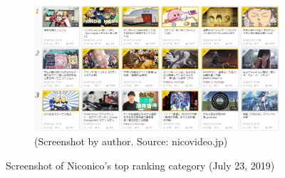 \documentclass[10pt,british,A4paper,,openany]{memoir}
\begin{document}
\begin{figure}[!htb]
 \centering
 \begin{subfigure}[b]{0.75\textwidth}
  \includegraphics[width=\textwidth]{images/2channel/niconico.jpg}
  \caption*{(Screenshot by author. Source: nicovideo.jp)}
 \end{subfigure}
 \caption{Screenshot of Niconico's top ranking category (July 23, 2019)}\label{fig:nicotop}
\end{figure}
\end{document}
